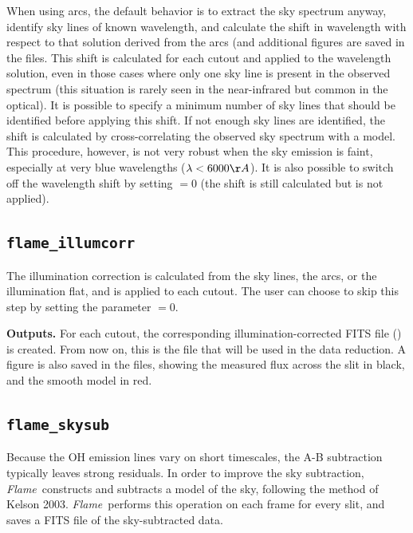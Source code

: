 \documentclass[a4paper]{article}
\newcommand{\flame}{\emph{Flame}}
\begin{document}
\begin{sloppypar}
When using arcs, the default behavior is to extract the sky spectrum anyway, identify sky lines of known wavelength, and calculate the shift in wavelength with respect to that solution derived from the arcs (and additional figures are saved in the  files. This shift is calculated for each cutout and applied to the wavelength solution, even in those cases where only one sky line is present in the observed spectrum (this situation is rarely seen in the near-infrared but common in the optical). It is possible to specify a minimum number of sky lines that should be identified before applying this shift. If not enough sky lines are identified, the shift is calculated by cross-correlating the observed sky spectrum with a model. This procedure, however, is not very robust when the sky emission is faint, especially at very blue wavelengths ($\lambda < 6000\AA$). It is also possible to switch off the wavelength shift by setting $=0$ (the shift is still calculated but is not applied).


\subsection{\texttt{flame\_illumcorr}}

The illumination correction is calculated from the sky lines, the arcs, or the illumination flat, and is applied to each cutout. The user can choose to skip this step by setting the parameter $=0$.

\medskip
\noindent
\textbf{Outputs.} For each cutout, the corresponding illumination-corrected FITS file () is created. From now on, this is the file that will be used in the data reduction. A figure is also saved in the  files, showing the measured flux across the slit in black, and the smooth model in red.



\subsection{\texttt{flame\_skysub}}

Because the OH emission lines vary on short timescales, the A-B subtraction typically leaves strong residuals. In order to improve the sky subtraction, \flame\ constructs and subtracts a model of the sky, following the method of Kelson 2003. \flame\ performs this operation on each frame for every slit, and saves a FITS file of the sky-subtracted data.


\end{sloppypar}
\end{document}
